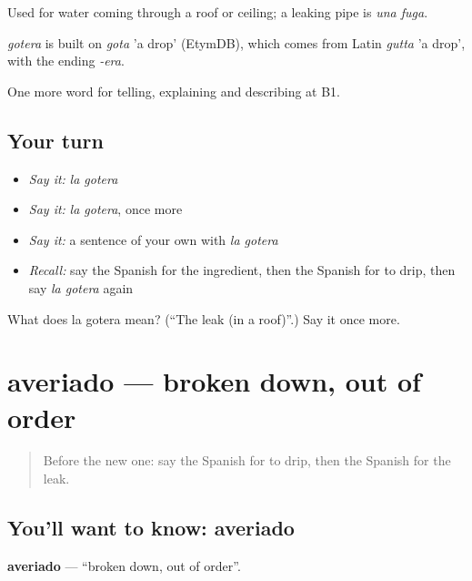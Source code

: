 Used for water coming through a roof or ceiling; a leaking pipe is \emph{una fuga}.

\begin{cousinweb}
\emph{gotera} is built on \emph{gota} 'a drop' (EtymDB), which comes from Latin \emph{gutta} 'a drop', with the ending \emph{-era}.
\end{cousinweb}

\begin{grammarlens}[title={What you've built}]
One more word for telling, explaining and describing at B1.
\end{grammarlens}

\subsection*{Your turn}
\begin{itemize}
\raggedright
  \item \emph{Say it:} \emph{la gotera}
  \item \emph{Say it:} \emph{la gotera}, once more
  \item \emph{Say it:} a sentence of your own with \emph{la gotera}
  \item \emph{Recall:} say the Spanish for the ingredient, then the Spanish for to drip, then say \emph{la gotera} again
\end{itemize}

\begin{tcolorbox}[breakable,colback=teal!4,colframe=teal!35!black,title={Before you move on}]
What does la gotera mean? (\textquotedblleft{}The leak (in a roof)\textquotedblright{}.) Say it once more.
\end{tcolorbox}
\section[averiado]{averiado — broken down, out of order}

\label{lesson:ES-C769-averiado}



\begin{quote}
Before the new one: say the Spanish for to drip, then the Spanish for the leak.
\end{quote}

\subsection*{You'll want to know: averiado}
\textbf{averiado} — \textquotedblleft{}broken down, out of order\textquotedblright{}.


